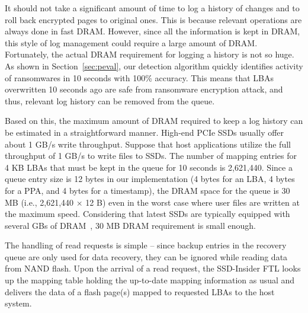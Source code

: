 \documentclass[conference]{IEEEtran}
\newcommand{\ours}{SSD-Insider}
\begin{document}
It should not take a significant amount of time to log a history of
changes and to roll back encrypted pages to original ones. This is
because relevant operations are always done in fast DRAM.  However,
since all the information is kept in DRAM, this style of log
management could require a large amount of DRAM.  Fortunately, the
actual DRAM requirement for logging a history is not so huge.  As
shown in Section~\ref{sec:peval}, our detection algorithm
quickly identifies activity of ransomwares in 10 seconds with
100\% accuracy. This means that LBAs overwritten 10 seconds ago
are safe from ransomware encryption attack, and thus, relevant log
history can be removed from the queue. 

Based on this, the maximum amount of DRAM required to keep a log
history can be estimated in a straightforward manner.  High-end
PCIe SSDs usually offer about 1 GB/s write throughput.  Suppose
that host applications utilize the full throughput of 1 GB/s to
write files to SSDs.  The number of mapping entries for 4 KB LBAs
that must be kept in the queue for 10 seconds is 2,621,440.  Since
a queue entry size is 12 bytes in our implementation (4 bytes for
an LBA, 4 bytes for a PPA, and 4 bytes for a timestamp), the DRAM
space for the queue is 30 MB (i.e., 2,621,440 $\times$ 12 B) even
in the worst case where user files are written at the maximum
speed.  Considering that latest SSDs are typically equipped with
several GBs of DRAM~\cite{hitachi-ssd, samsung-ssd, phison-ssd}, 30
MB DRAM requirement is small enough.

The handling of read requests is simple -- since backup entries in
the recovery queue are only used for data recovery, they can be
ignored while reading data from NAND flash. Upon the arrival of a
read request, the \ours{} FTL looks up the mapping table
holding the up-to-date mapping information as usual and delivers
the data of a flash page(s) mapped to requested LBAs to the host
system.
\end{document}
